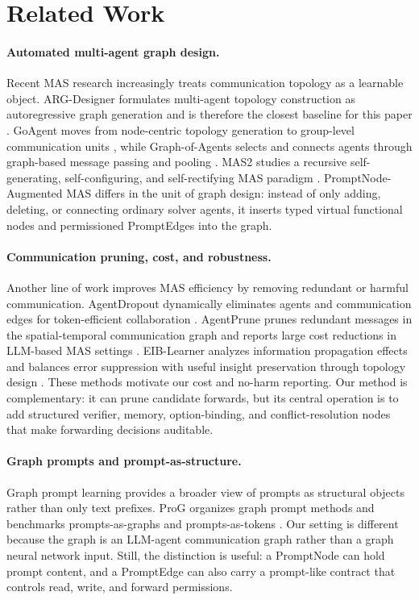 \section{Related Work}
\label{sec:related}

\paragraph{Automated multi-agent graph design.}
Recent MAS research increasingly treats communication topology as a learnable object. ARG-Designer formulates multi-agent topology construction as autoregressive graph generation and is therefore the closest baseline for this paper \cite{li2026argdesigner}. GoAgent moves from node-centric topology generation to group-level communication units \cite{chen2026goagent}, while Graph-of-Agents selects and connects agents through graph-based message passing and pooling \cite{yun2026goa}. MAS2 studies a recursive self-generating, self-configuring, and self-rectifying MAS paradigm \cite{wang2026mas2}. PromptNode-Augmented MAS differs in the unit of graph design: instead of only adding, deleting, or connecting ordinary solver agents, it inserts typed virtual functional nodes and permissioned PromptEdges into the graph.

\paragraph{Communication pruning, cost, and robustness.}
Another line of work improves MAS efficiency by removing redundant or harmful communication. AgentDropout dynamically eliminates agents and communication edges for token-efficient collaboration \cite{wang2025agentdropout}. AgentPrune prunes redundant messages in the spatial-temporal communication graph and reports large cost reductions in LLM-based MAS settings \cite{zhang2025agentprune}. EIB-Learner analyzes information propagation effects and balances error suppression with useful insight preservation through topology design \cite{shen2025eiblearner}. These methods motivate our cost and no-harm reporting. Our method is complementary: it can prune candidate forwards, but its central operation is to add structured verifier, memory, option-binding, and conflict-resolution nodes that make forwarding decisions auditable.

\paragraph{Graph prompts and prompt-as-structure.}
Graph prompt learning provides a broader view of prompts as structural objects rather than only text prefixes. ProG organizes graph prompt methods and benchmarks prompts-as-graphs and prompts-as-tokens \cite{zi2024prog}. Our setting is different because the graph is an LLM-agent communication graph rather than a graph neural network input. Still, the distinction is useful: a PromptNode can hold prompt content, and a PromptEdge can also carry a prompt-like contract that controls read, write, and forward permissions.

